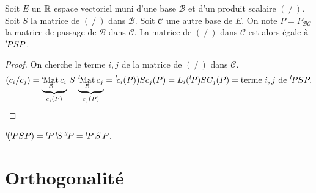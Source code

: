 \begin{prop}
Soit $E$ un $\mathbb{R}$ espace vectoriel muni d'une base $\mathcal{B}$ et d'un produit scalaire  $(~/~)$. Soit $S$ la matrice de $(~/~)$ dans $\mathcal{B}$. Soit $\mathcal{C}$ une autre base de $E$. On note $P = P_{\mathcal{BC}}$ la matrice de passage de $\mathcal{B}$ dans $\mathcal{C}$.\newline
La matrice de $(~/~)$ dans $\mathcal{C}$ est alors égale à $\mathstrut^t\! P SP$.
\end{prop}
\begin{proof}
On cherche le terme $i,j$ de la matrice de $(~/~)$ dans $\mathcal{C}$.
\begin{displaymath}
(c_i/c_j) = \underset{c_i(P)}{\underbrace{\mathstrut^t\! {\mathop{\mathrm{Mat}}_{\mathcal{B}} c_i}}}~S~\underset{c_j(P)}{\underbrace{\mathstrut^t\!{\mathop{\mathrm{Mat}}_{\mathcal{B}} c_j}}} = \mathstrut^t\!{ c_i(P) ) S c_j(P) } = L_i( \mathstrut^t\! P ) S C_j(P) = \text{terme }i,j\text{ de }\mathstrut^t\! P S P .
\end{displaymath}
\end{proof}
\begin{rem}
$\mathstrut^t\!{(\mathstrut^t\! PSP)} = \mathstrut^t\! P\,\mathstrut^t\!{S}\,\mathstrut^t\!{\mathstrut^t\! P} = \mathstrut^t\! P\,S\,P$.
\end{rem}
\newpage
\section{Orthogonalité}
